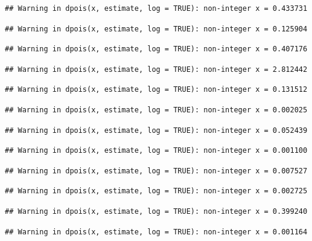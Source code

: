 \documentclass[]{article}
\begin{document}
\begin{verbatim}
## Warning in dpois(x, estimate, log = TRUE): non-integer x = 0.433731
\end{verbatim}

\begin{verbatim}
## Warning in dpois(x, estimate, log = TRUE): non-integer x = 0.125904
\end{verbatim}

\begin{verbatim}
## Warning in dpois(x, estimate, log = TRUE): non-integer x = 0.407176
\end{verbatim}

\begin{verbatim}
## Warning in dpois(x, estimate, log = TRUE): non-integer x = 2.812442
\end{verbatim}

\begin{verbatim}
## Warning in dpois(x, estimate, log = TRUE): non-integer x = 0.131512
\end{verbatim}

\begin{verbatim}
## Warning in dpois(x, estimate, log = TRUE): non-integer x = 0.002025
\end{verbatim}

\begin{verbatim}
## Warning in dpois(x, estimate, log = TRUE): non-integer x = 0.052439
\end{verbatim}

\begin{verbatim}
## Warning in dpois(x, estimate, log = TRUE): non-integer x = 0.001100
\end{verbatim}

\begin{verbatim}
## Warning in dpois(x, estimate, log = TRUE): non-integer x = 0.007527
\end{verbatim}

\begin{verbatim}
## Warning in dpois(x, estimate, log = TRUE): non-integer x = 0.002725
\end{verbatim}

\begin{verbatim}
## Warning in dpois(x, estimate, log = TRUE): non-integer x = 0.399240
\end{verbatim}

\begin{verbatim}
## Warning in dpois(x, estimate, log = TRUE): non-integer x = 0.001164
\end{verbatim}
\end{document}
